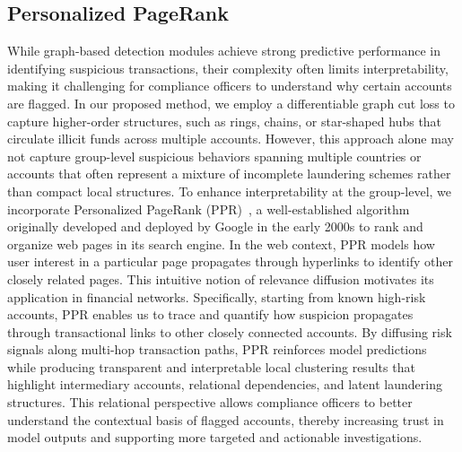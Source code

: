 \documentclass[11pt,english]{article}
\newcommand{\lc}[1]{{\textsf{\textcolor{blue}{[LC: #1]}}}}
\begin{document}
\subsection{Personalized PageRank}
While graph-based detection modules achieve strong predictive performance in identifying suspicious transactions, their complexity often limits interpretability, making it challenging for compliance officers to understand why certain accounts are flagged. In our proposed method, we employ a differentiable graph cut loss to capture higher-order structures, such as rings, chains, or star-shaped hubs that circulate illicit funds across multiple accounts. However, this approach alone may not capture group-level suspicious behaviors spanning multiple countries or accounts that often represent a mixture of incomplete laundering schemes rather than compact local structures. To enhance interpretability at the group-level, we incorporate Personalized PageRank (PPR)~\parencite{page1999pagerank}, a well-established algorithm originally developed and deployed by Google in the early 2000s to rank and organize web pages in its search engine. In the web context, PPR models how user interest in a particular page propagates through hyperlinks to identify other closely related pages. This intuitive notion of relevance diffusion motivates its application in financial networks. Specifically, starting from known high-risk accounts, PPR enables us to trace and quantify how suspicion propagates through transactional links to other closely connected accounts. By diffusing risk signals along multi-hop transaction paths, PPR reinforces model predictions while producing transparent and interpretable local clustering results that highlight intermediary accounts, relational dependencies, and latent laundering structures. This relational perspective allows compliance officers to better understand the contextual basis of flagged accounts, thereby increasing trust in model outputs and supporting more targeted and actionable investigations.


\end{document}
